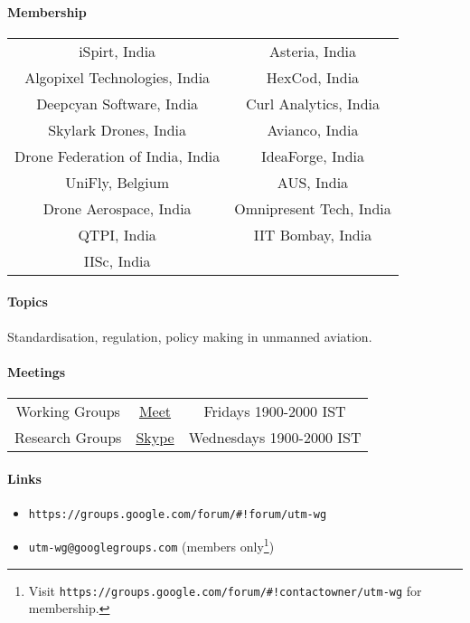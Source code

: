 \documentclass{ua_wgs_base}
\begin{document}
\paragraph*{Membership}
\begin{center}
\begin{tabular}{|c|c|}
\hline 
iSpirt, India & Asteria, India\tabularnewline
Algopixel Technologies, India & HexCod, India\tabularnewline
Deepcyan Software, India & Curl Analytics, India\tabularnewline
Skylark Drones, India & Avianco, India\tabularnewline
Drone Federation of India, India & IdeaForge, India\tabularnewline
UniFly, Belgium & AUS, India\tabularnewline
Drone Aerospace, India & Omnipresent Tech, India\tabularnewline
QTPI, India & IIT Bombay, India\tabularnewline
IISc, India & \tabularnewline
\hline 
\end{tabular}
\par\end{center}

\paragraph*{Topics}

Standardisation, regulation, policy making in unmanned aviation. 

\paragraph*{Meetings}
\begin{center}
\begin{tabular}{|c|c|c|}
\hline 
Working Groups & \href{https://meet.google.com/urz-pekp-rwr}{Meet} & Fridays 1900-2000 IST\tabularnewline
Research Groups & \href{https://join.skype.com/RkNeUB8wNvzx}{Skype} & Wednesdays 1900-2000 IST\tabularnewline
\hline 
\end{tabular}
\par\end{center}

\paragraph*{Links}
\begin{itemize}
\item \texttt{https://groups.google.com/forum/\#!forum/utm-wg}
\item \texttt{utm-wg@googlegroups.com} (members only\footnote{Visit \texttt{https://groups.google.com/forum/\#!contactowner/utm-wg}
for membership.})
\end{itemize}
\end{document}
